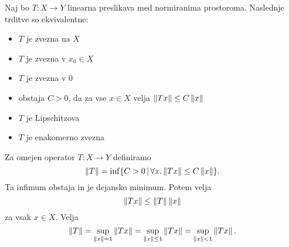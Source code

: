 
\begin{izrek}
  Naj bo $T: X \to Y$ linearna preslikava med normiranima prostoroma.
  Naslednje trditve so ekvivalentne:
  \begin{itemize}
  \item $T$ je zvezna na $X$
  \item $T$ je zvezna v $x_0 \in X$
  \item $T$ je zvezna v $0$
  \item obstaja $C > 0$, da za vse $x \in X$ velja $\left\lVert Tx\right\rVert \le C \left\lVert x\right\rVert$
  \item $T$ je Lipschitzova
  \item $T$ je enakomerno zvezna
  \end{itemize}
\end{izrek}

Za omejen operator $T: X \to Y$ definiramo
\[
  \left\lVert T\right\rVert = \inf \{ C > 0 \,|\, \forall x . \left\lVert Tx\right\rVert \le C \left\lVert x\right\rVert \}.
\]
Ta infimum obstaja in je dejansko minimum.
Potem velja
\[
  \left\lVert Tx\right\rVert \le \left\lVert T\right\rVert \left\lVert x\right\rVert
\]
za vsak $x \in X$.
Velja
\[
  \left\lVert T\right\rVert = \sup_{\left\lVert x\right\rVert = 1} \left\lVert Tx\right\rVert
  = \sup_{\left\lVert x\right\rVert \le 1} \left\lVert Tx\right\rVert
  = \sup_{\left\lVert x\right\rVert < 1} \left\lVert Tx\right\rVert.
\]